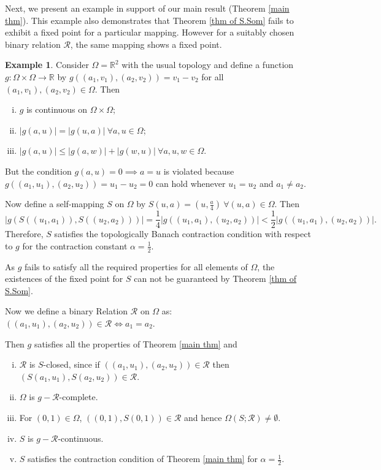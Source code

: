 \documentclass[10pt, reqno]{amsart}
\theoremstyle{definition}
\newtheorem{example}[theorem]{Example}
\theoremstyle{remark}
\numberwithin{equation}{section}
\begin{document}
 
Next, we present an example in support of our main result (Theorem \ref{main thm}). 	This example also demonstrates that Theorem \ref{thm of S.Som} fails to exhibit a fixed point for a particular mapping. However for a suitably chosen binary relation $ \mathcal{R} $, the same mapping shows a fixed point. 


  

\begin{example}
 Consider $ \Omega = \mathbb{R}^2 $ with the usual topology and define a function $   g : \Omega \times \Omega \to \mathbb{R} $ by  $ g( ( a_1, v_1 ), ( a_2, v_2 ) ) =    v_1 - v_2 $   for all $ ( a_1, v_1 ), ( a_2, v_2 ) \in \Omega $.  
	Then   
	\begin{enumerate}[(i)]
		\item   $  g $  is continuous on $ \Omega \times \Omega $;
		\item $ | g( a, u )| = | g( u, a )| ~  \forall a, u \in \Omega $;
		\item $  |g( a, u )| \leq |g( a, w )| + |g( w, u )| ~ \forall a, u,   w \in \Omega $.
	\end{enumerate}
    
But the condition $ g ( a, u ) = 0 \implies a = u $ is violated because $ g( ( a_1, u_1 ), ( a_2, u_2 ) ) = u_1 - u_2  = 0 $ can hold whenever $  u_1 = u_2 $ and $ a_1 \neq a_2 $.  

	Now define a self-mapping $ S $ on $ \Omega $ by $ S (  u,  a ) = ( u, \frac{a}{4}) ~ \forall ( u, a ) \in \Omega $. Then 
	$$ | g ( S (( u_1, a_1)), S ( ( u_2, a_2 ) ) ) | = \frac{1}{4} | g( ( u_1, a_1 ), ( u_2, a_2 ) ) | < \frac{1}{2} | g ( ( u_1, a_1 ), ( u_2, a_2 ) ) |.  $$
	Therefore, $ S $ satisfies the topologically Banach contraction condition with respect to $g$ for the contraction constant $ \alpha = \frac{1}{2} $. 
    
	As $ g $ fails to satisfy all the  required properties for all elements of $ \Omega $, the existences of   the fixed point for $ S $ can not be guaranteed by   Theorem \ref{thm of S.Som}. 
    
	Now we define a binary Relation $ \mathcal{R} $ on $ \Omega $ as: $  ( ( a_1, u_1 ), ( a_2, u_2 )) \in    \mathcal{R} \iff  a_1 = a_2 $.
    
	Then $g$ satisfies all the properties of Theorem \ref{main thm} and 
	\begin{enumerate}[(i)]
		\item $  \mathcal{R} $ is  $ S $-closed, since if $ ( ( a_1, u_1 ), ( a_2, u_2 ) ) \in \mathcal{R} $ then $   ( S ( a_1, u_1 ), S ( a_2, u_2 ) ) \in \mathcal{R} $.
		\item $ \Omega $ is $ g-\mathcal{R} $-complete.
		\item For   $ (0, 1) \in \Omega $, $ ( ( 0, 1 ), S (0, 1) ) \in \mathcal{R} $ and hence  $ \Omega ( S; \mathcal{R}) \neq \emptyset $.  
		\item $ S $ is $  g-\mathcal{R} $-continuous.
		\item  $S $ satisfies the contraction condition of  Theorem \ref{main thm}  for $ \alpha  = \frac{1}{2} $.
	\end{enumerate}
    

\end{example}
\end{document}

